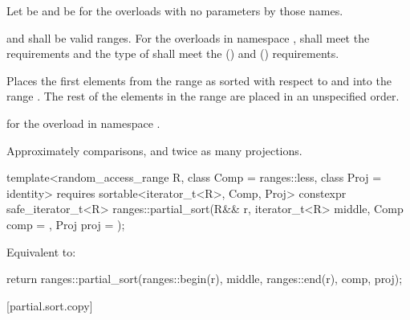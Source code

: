 \begin{itemdescr}
\pnum
Let  be 
and  be 
for the overloads with no parameters by those names.

\pnum
\requires
{} and  shall be valid ranges.
For the overloads in namespace ,
 shall meet
the  requirements and
the type of  shall meet
the  () and
 () requirements.

\pnum
\effects
Places the first  elements
from the range 
as sorted with respect to  and 
into the range .
The rest of the elements in the range 
are placed in an unspecified order.
%

\pnum
\returns
{} for the overload in namespace .

\pnum
\complexity
Approximately  comparisons, and
twice as many projections.
\end{itemdescr}

\begin{itemdecl}
template<random_access_range R, class Comp = ranges::less, class Proj = identity>
  requires sortable<iterator_t<R>, Comp, Proj>
  constexpr safe_iterator_t<R>
    ranges::partial_sort(R&& r, iterator_t<R> middle, Comp comp = {}, Proj proj = {});
\end{itemdecl}

\begin{itemdescr}
\pnum
\effects
Equivalent to:
\begin{codeblock}
return ranges::partial_sort(ranges::begin(r), middle, ranges::end(r), comp, proj);
\end{codeblock}
\end{itemdescr}

[partial.sort.copy]{}

